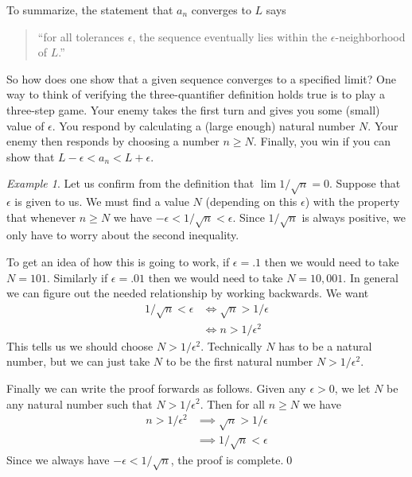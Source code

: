 \documentclass[11pt,oneside]{amsbook}
\theoremstyle{definition}
\theoremstyle{plain}
\theoremstyle{definition}
\theoremstyle{remark}
\newtheorem{example}[thm]{Example}
\numberwithin{equation}{section}
\numberwithin{figure}{section}
\begin{document}
To summarize, the statement that $a_n$ converges to $L$ says
\begin{quotation}
 ``for all tolerances $\epsilon$, the sequence eventually lies within the $\epsilon$-neighborhood of $L$.''
\end{quotation}

So how does one show that a given sequence converges to a specified limit? One way to think of verifying the three-quantifier definition holds true is to play a three-step game. Your enemy takes the first turn and gives you some (small) value of $\epsilon$. You respond by calculating a (large enough) natural number $N$. Your enemy then responds by choosing a number $n\geq N$. Finally, you win if you can show that $L-\epsilon<a_n<L+\epsilon$.

\begin{example}
  Let us confirm from the definition that $\lim1/\sqrt{n}=0$. Suppose that $\epsilon$ is given to us. We must find a value $N$ (depending on this $\epsilon$) with the property that whenever $n\geq N$ we have $-\epsilon<1/\sqrt{n}<\epsilon$. Since $1/\sqrt{n}$ is always positive, we only have to worry about the second inequality.

  To get an idea of how this is going to work, if $\epsilon=.1$ then we would need to take $N=101$. Similarly if $\epsilon=.01$ then we would need to take $N=10,001$. In general we can figure out the needed relationship by working backwards. We want
  \begin{align*}
    1/\sqrt{n}<\epsilon &\iff \sqrt{n}>1/\epsilon\\
                        &\iff n>1/\epsilon^2
  \end{align*}
  This tells us we should choose $N>1/\epsilon^2$. Technically $N$ has to be a natural number, but we can just take $N$ to be the first natural number $N>1/\epsilon^2$.

  Finally we can write the proof forwards as follows. Given any $\epsilon>0$, we let $N$ be any natural number such that $N>1/\epsilon^2$. Then for all $n\geq N$ we have
  \begin{align*}
    n>1/\epsilon^2&\implies\sqrt{n}>1/\epsilon\\
                  &\implies1/\sqrt{n}<\epsilon
  \end{align*}
  Since we always have $-\epsilon<1/\sqrt{n}$, the proof is complete.\qed
\end{example}
\end{document}
